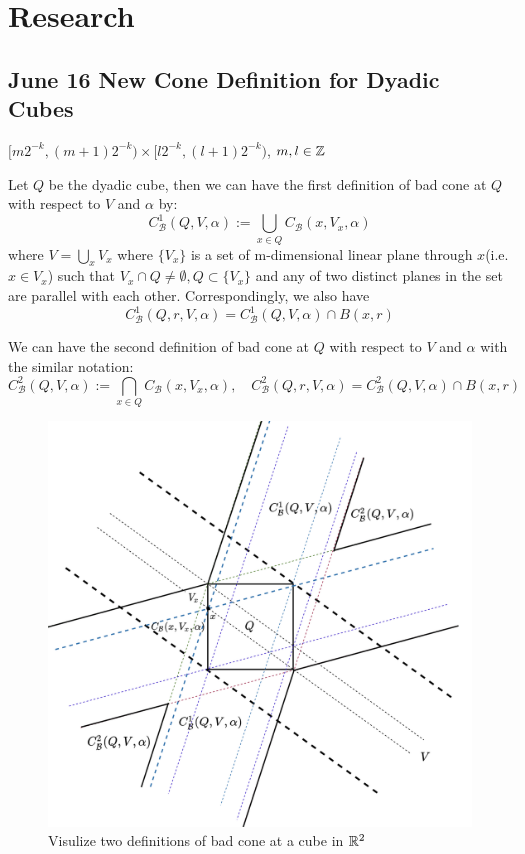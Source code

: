 \section{Research}

\subsection{June 16 New Cone Definition for Dyadic Cubes}
\begin{definition}
    $[m 2^{-k}, (m+1)2^{-k}) \times [l2^{-k}, (l+1)2^{-k})$, $m,l\in\mathbb{Z}$
\end{definition}

\begin{definition} Let $Q$ be the dyadic cube, then we can have the first definition of bad cone at $Q$ with respect to $V$ and $\alpha$ by:
    $$C^1_{\mathcal{B}}(Q, V, \alpha) := \bigcup_{x\in Q} C_\mathcal{B}(x, V_x, \alpha)$$
    where $V = \bigcup_x V_x$ where $\{V_x\}$ is a set of m-dimensional linear plane through $x$(i.e. $x\in V_x$) such that $V_x\cap Q\neq\emptyset, Q\subset \{V_x\}$ and any of two distinct planes in the set are parallel with each other. Correspondingly, we also have
    $$
    C^1_{\mathcal{B}}(Q, r, V, \alpha) = C^1_{\mathcal{B}}(Q, V, \alpha) \cap B(x,r)
    $$
\end{definition}

\begin{definition}
    We can have the second definition of bad cone at $Q$ with respect to $V$ and $\alpha$ with the similar notation:
    $$C^2_{\mathcal{B}}(Q, V, \alpha) := \bigcap_{x\in Q} C_\mathcal{B}(x, V_x, \alpha), \quad
    C^2_{\mathcal{B}}(Q, r, V, \alpha) = C^2_{\mathcal{B}}(Q, V, \alpha) \cap B(x,r)
    $$
\end{definition}
\begin{figure}[H]
    \centering
    \includegraphics[width=.66\textwidth]{images/cubebadconeDef.png}
    \caption{Visulize two definitions of bad cone at a cube in $\mathbb{R}^2$}
\end{figure}

